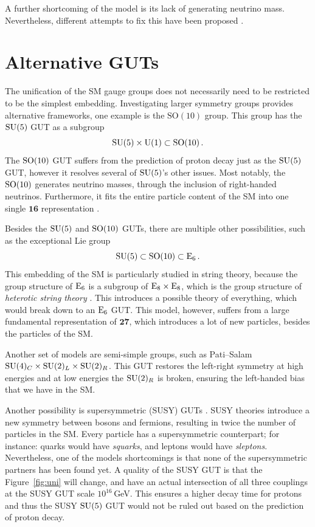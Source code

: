 A further shortcoming of the model is its lack of generating neutrino mass. Nevertheless, different attempts to fix this have been proposed \cite{FileviezPerez:2007bcw, Zee:1980ai,FileviezPerez:2016sal}. 

\section{Alternative GUTs}
The unification of the SM gauge groups does not necessarily need to be restricted to be the simplest embedding. Investigating larger symmetry groups provides alternative frameworks, one example is the $\mathrm{SO}(10)$ group. This group has the $\mathrm{SU}(5)$ GUT as a subgroup \cite{Georgi:1999wka}
\begin{equation}
    \mathrm{SU}(5)\times \mathrm{U} (1)\subset \mathrm{SO}(10)\,.
\end{equation}
The $\mathrm{SO} (10)$ GUT suffers from the prediction of proton decay just as the $\mathrm{SU}(5)$ GUT, however it resolves several of $\mathrm{SU}(5)$'s other issues. Most notably, the $\mathrm{SO}(10)$ generates neutrino masses, through the inclusion of right-handed neutrinos. Furthermore, it fits the entire particle content of the SM into one single $\mathbf{16}$ representation \cite{Fritzsch:1974nn}. 

Besides the $\mathrm{SU} (5)$ and $\mathrm{SO}(10)$ GUTs, there are multiple other possibilities, such as the exceptional Lie group \cite{Gursey:1975ki}
\begin{equation}
    \mathrm{SU}(5)\subset\mathrm{SO}(10)\subset\mathrm{E}_6\,.
\end{equation}
This embedding of the SM is particularly studied in string theory, because the group structure of $\mathrm{E}_6$ is a subgroup of $\mathrm{E}_8\times\mathrm{E}_8$, which is the group structure of \textit{heterotic string theory} \cite{Witten:1985xc,Candelas:1985en}. This introduces a possible theory of everything, which would break down to an $\mathrm{E}_6$ GUT. This model, however, suffers from a large fundamental representation of $\mathbf{27}$, which introduces a lot of new particles, besides the particles of the SM. 

Another set of models are semi-simple groups, such as Pati--Salam \cite{Pati:1974yy} $\mathrm{SU}(4)_C\times \mathrm{SU}(2)_L\times\mathrm{SU}(2)_R$. This GUT restores the left-right symmetry at high energies and at low energies the $\mathrm{SU}(2)_R$ is broken, ensuring the left-handed bias that we have in the SM. 

Another possibility is supersymmetric (SUSY) GUTs \cite{Dimopoulos:1981zb}. SUSY theories introduce a new symmetry between bosons and fermions, resulting in twice the number of particles in the SM. Every particle has a supersymmetric counterpart; for instance: quarks would have \textit{squarks}, and leptons would have \textit{sleptons}. Nevertheless, one of the models shortcomings is that none of the supersymmetric partners has been found yet. A quality of the SUSY GUT is that the Figure~\ref{fig:uni} will change, and have an actual intersection of all three couplings at the SUSY GUT scale $10^{16}\,$GeV. This ensures a higher decay time for protons and thus the SUSY $\mathrm{SU}(5)$ GUT would not be ruled out based on the prediction of proton decay. 

